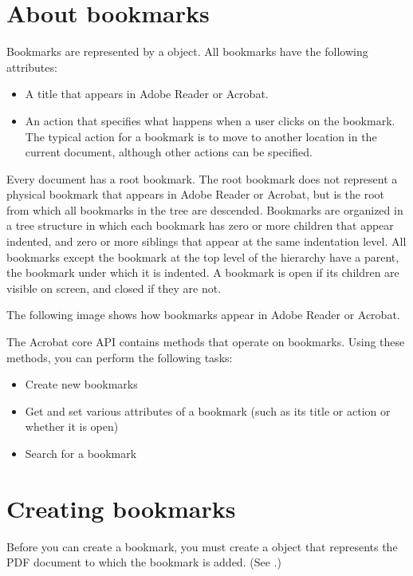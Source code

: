 \documentclass[letterpaper,12pt,english,openany,oneside]{sphinxmanual}
\begin{document}
\section{About bookmarks}
\label{\detokenize{Plugins_Bookmark:about-bookmarks}}
Bookmarks are represented by a  object. All bookmarks have the following attributes:
\begin{itemize}
\item {} 
A title that appears in Adobe Reader or Acrobat.

\item {} 
An action that specifies what happens when a user clicks on the bookmark. The typical action for a bookmark is to move to another location in the current document, although other actions can be specified.

\end{itemize}

Every document has a root bookmark. The root bookmark does not represent a physical bookmark that appears in Adobe Reader or Acrobat, but is the root from which all bookmarks in the tree are descended. Bookmarks are organized in a tree structure in which each bookmark has zero or more children that appear indented, and zero or more siblings that appear at the same indentation level. All bookmarks except the bookmark at the top level of the hierarchy have a parent, the bookmark under which it is indented. A bookmark is open if its children are visible on screen, and closed if they are not.

The following image shows how bookmarks appear in Adobe Reader or Acrobat.

\noindent{}

The Acrobat core API contains methods that operate on bookmarks. Using these methods, you can perform the following tasks:
\begin{itemize}
\item {} 
Create new bookmarks

\item {} 
Get and set various attributes of a bookmark (such as its title or action or whether it is open)

\item {} 
Search for a bookmark

\end{itemize}


\section{Creating bookmarks}
\label{\detokenize{Plugins_Bookmark:creating-bookmarks}}
Before you can create a bookmark, you must create a  object that represents the PDF document to which the bookmark is added. (See .)
\end{document}
